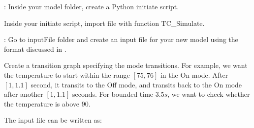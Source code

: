 \documentclass[letterpaper,10pt,english]{sphinxmanual}
\begin{document}
:
Inside your model folder, create a Python initiate script.

\begin{sphinxVerbatim}[commandchars=\\\{\}]
 
\end{sphinxVerbatim}

Inside your initiate script, import file with function TC\_Simulate.

\begin{sphinxVerbatim}[commandchars=\\\{\}]
   
\end{sphinxVerbatim}

:
Go to inputFile folder and create an input file for your new model using the format discussed in {\hyperref[\detokenize{dryvr's_language:input-format-label}]{}}.

Create a transition graph specifying the mode transitions. For example, we want the temperature to start within the range \([75,76]\) in the \sphinxquotedblleft{}On\sphinxquotedblright{} mode. After \([1,1.1]\) second, it transits to the \sphinxquotedblleft{}Off\sphinxquotedblright{} mode, and transits back to the \sphinxquotedblleft{}On\sphinxquotedblright{} mode after another \([1,1.1]\) seconds. For bounded time \(3.5s\), we want to check whether the temperature is above \(90\).

The input file can be written as:
\end{document}
